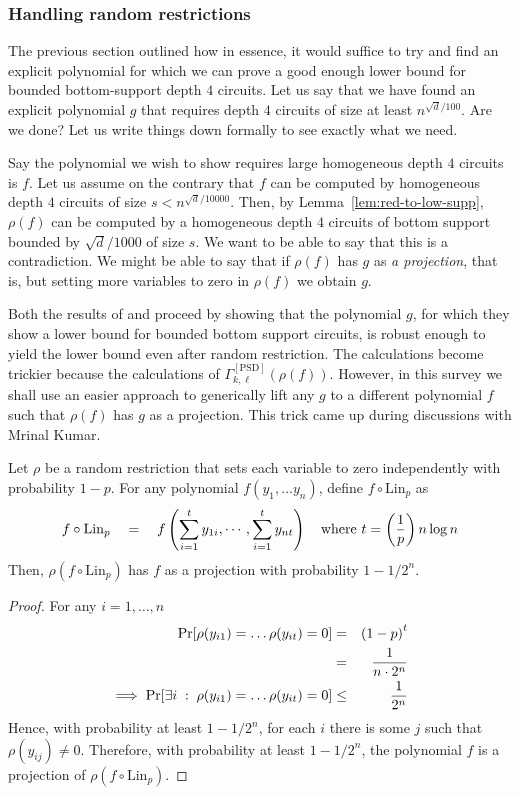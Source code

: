 \documentclass[12pt]{report}
\begin{document}
\subsubsection{Handling random restrictions}

The previous section outlined how in essence, it would suffice to try and find an explicit polynomial for which we can prove a good enough lower bound for bounded bottom-support depth $4$ circuits. Let us say that we have found an explicit polynomial $g$ that requires depth $4$ circuits of size at least $n^{\sqrt{d}/100}$. Are we done? Let us write things down formally to see exactly what we need. 

Say the polynomial we wish to show requires large homogeneous depth $4$ circuits is $f$. Let us assume on the contrary that $f$ can be computed by homogeneous depth $4$ circuits of size $s < n^{\sqrt{d}/10000}$. Then, by Lemma~\ref{lem:red-to-low-supp}, $\rho(f)$ can be computed by a homogeneous depth $4$ circuits of bottom support bounded by $\sqrt{d}/1000$ of size $s$. We want to be able to say that this is a contradiction. We might be able to say that if $\rho(f)$ has $g$ as \emph{a projection}, that is, but setting more variables to zero in $\rho(f)$ we obtain $g$. 

Both the results of \cite{KLSS} and \cite{KS14} proceed by showing that the polynomial $g$, for which they show a lower bound for bounded bottom support circuits, is robust enough to yield the lower bound even after random restriction. The calculations become trickier because the calculations of $\Gamma^{[\mathrm{PSD}]}_{k,\ell}(\rho(f))$. However, in this survey we shall use an easier approach to generically lift any $g$ to a different polynomial $f$ such that $\rho(f)$ has $g$ as a projection. This trick came up during discussions with Mrinal Kumar. 

\begin{lemma}\label{lem:lin-transform-trick}
Let $\rho$ be a random restriction that sets each variable to zero independently with probability $1 - p$. For any polynomial $f(y_1,\dots y_n)$, define $f \circ \mathrm{Lin}_p$ as
\[
f \circ \mathrm{Lin}_p \quad = \quad f\left(\sum_{i=1}^t y_{1i}, \cdots, \sum_{i=1}^t y_{nt}\right)\quad \text{where $t = \left(\frac{1}{p}\right) n \log n$}
\]
Then, $\rho(f \circ \mathrm{Lin}_p)$ has $f$ as a projection with probability $1 - 1/2^{n}$. 
\end{lemma}
\begin{proof} For any $i = 1, \dots, n$
\begin{eqnarray*}
\quad \Pr[\rho(y_{i1}) = \dots \rho(y_{it}) = 0 ] & = & \left(1 - p\right)^t\\ 
& = & \frac{1}{n\cdot 2^n}\\
\implies \Pr[\exists i\;:\;\rho(y_{i1}) = \dots \rho(y_{it}) = 0 ]  & \leq  & \frac{1}{2^n} 
\end{eqnarray*}
Hence, with probability at least $1 - 1/2^n$, for each $i$ there is some $j$ such that $\rho(y_{ij}) \neq 0$. Therefore, with probability at least $1 - 1/2^n$, the polynomial $f$ is a projection of $\rho(f \circ \mathrm{Lin}_p)$. \end{proof}
\end{document}
